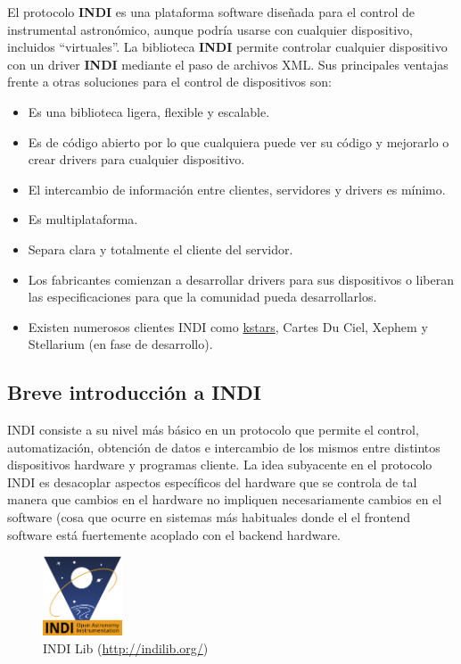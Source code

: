 \bigskip
El protocolo \textbf{INDI} es una plataforma software diseñada para el control de instrumental astronómico, aunque podría usarse con cualquier dispositivo, incluidos ``virtuales''. La biblioteca \textbf{INDI} permite controlar cualquier dispositivo con un driver \textbf{INDI} mediante el paso de archivos XML. Sus principales ventajas frente a otras soluciones para el control de dispositivos son:


\begin{itemize}
	\item Es una biblioteca ligera, flexible y escalable.
	\item Es de código abierto por lo que cualquiera puede ver su código y mejorarlo o crear drivers para cualquier dispositivo.
	\item El intercambio de información entre clientes, servidores y drivers es mínimo.
	\item Es multiplataforma.
	\item Separa clara y totalmente el cliente del servidor.
	\item Los fabricantes comienzan a desarrollar drivers para sus dispositivos o liberan las especificaciones para que la comunidad pueda desarrollarlos.
	\item Existen numerosos clientes INDI como \href{https://edu.kde.org/kstars/}{kstars}, Cartes Du Ciel, Xephem y Stellarium (en fase de desarrollo).
	
\end{itemize}


\bigskip

\subsection{Breve introducción a INDI}

INDI consiste a su nivel más básico en un protocolo que permite el control, automatización, obtención de datos e intercambio de los mismos entre distintos dispositivos hardware y programas cliente. La idea subyacente en el protocolo INDI es desacoplar aspectos específicos del hardware que se controla de tal manera que cambios en el hardware no impliquen necesariamente cambios en el software (cosa que ocurre en sistemas más habituales donde el el frontend software está fuertemente acoplado con el backend hardware.

\bigskip
\begin{figure}[!ht]
	\begin{center}
		\includegraphics[width=0.21\textwidth]{../images/indi.png}
		\caption[INDI Lib]{INDI Lib (\href{http://indilib.org/}{http://indilib.org/})}
		\label{fig:ascom}
	\end{center}
\end{figure}


